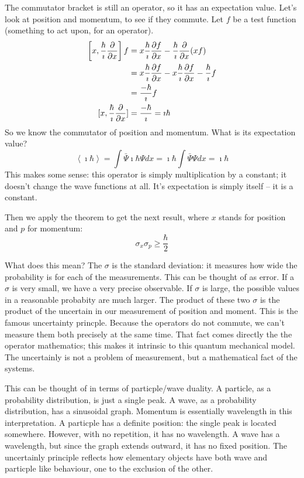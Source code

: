 \documentclass[fleqn,letterpaper]{report}
\begin{document}
The commutator bracket is still an operator, so it has an
expectation value. Let's look at position and momentum, to see
if they commute. Let $f$ be a test function (something to
act upon, for an operator).
\begin{align*}
\left[x, \frac{\hbar}{\imath} \frac{\del}{\del x} \right] f & = x
\frac{\hbar}{\imath} \frac{\del f}{\del x} -
\frac{\hbar}{\imath} \frac{\del}{\del x} (xf) \\
& = x \frac{\hbar}{\imath} \frac{\del f}{\del x} - x
\frac{\hbar}{\imath} \frac{\del f}{\del x} -
\frac{\hbar}{\imath} f \\
& = \frac{-\hbar}{\imath} f \\
[x, \frac{\hbar}{\imath} \frac{\del}{\del x} ] & =
\frac{-\hbar}{\imath} = \imath \hbar
\end{align*}
So we know the commutator of position and momentum. What is
its expectation value?
\begin{equation*}
\left\langle \imath \hbar \right\rangle = \int
\bar{\Psi} \imath \hbar \Psi dx =
\imath \hbar \int \bar{\Psi} \Psi dx =
\imath \hbar 
\end{equation*}
This makes some sense: this operator is simply multiplication
by a constant; it doesn't change the wave functions at all.
It's expectation is simply itself -- it is a constant.

Then we apply the theorem to get the next result, where $x$ stands for
position and $p$ for momentum:
\begin{equation*}
\sigma_x \sigma_p \geq \frac{\hbar}{2} 
\end{equation*}
\newpage

What does this mean? The $\sigma$ is the standard deviation:
it measures how wide the probability is for each of the
measurements. This can be thought of as error. If a $\sigma$
is very small, we have a very precise observable. If $\sigma$
is large, the possible values in a reasonable probabity are
much larger. The product of these two $\sigma$ is the product
of the uncertain in our measurement of position and moment.
This is the famous uncertainty princple. Because the
operators do not commute, we can't measure them both precisely
at the same time. That fact comes directly the the operator
mathematics; this makes it intrinsic to this quantum
mechanical model. The uncertainly is not a problem of
measurement, but a mathematical fact of the systems. 

This can be thought of in terms of particple/wave duality. A
particle, as a probability distribution, is just a single peak. A
wave, as a probability distribution, has a sinusoidal graph.
Momentum is essentially wavelength in this interpretation. A
particple has a definite position: the single peak is located
somewhere. However, with no repetition, it has no wavelength.
A wave has a wavelength, but since the graph extends outward,
it has no fixed position. The uncertainly principle reflects
how elementary objects have both wave and particple like
behaviour, one to the exclusion of the other. 
\end{document}

